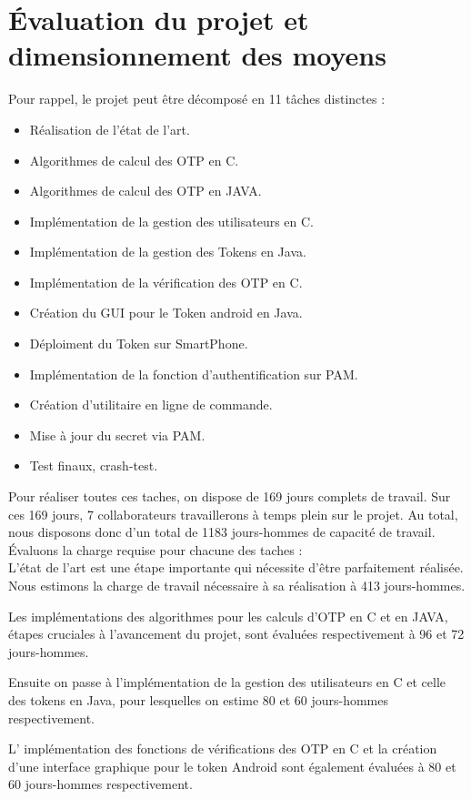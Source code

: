 \documentclass{../../res/univ-projet}
\begin{document}
\section{Évaluation du projet et dimensionnement des moyens}
	Pour rappel, le projet peut être décomposé en 11 tâches distinctes :
	\begin{itemize}
	  \item Réalisation de l'état de l'art.
	  \item Algorithmes de calcul des OTP en C.
	  \item Algorithmes de calcul des OTP en JAVA.
	  \item Implémentation de la gestion des utilisateurs en C.
	  \item Implémentation de la gestion des Tokens en Java.
	  \item Implémentation de la vérification des OTP en C.
	  \item Création du GUI pour le Token android en Java.
	  \item Déploiment du Token sur SmartPhone.
	  \item Implémentation de la fonction d'authentification sur PAM.
	  \item Création d'utilitaire en ligne de commande.
	  \item Mise à jour du secret via PAM.
	  \item Test finaux, crash-test.\\
	\end{itemize}

	Pour réaliser toutes ces taches, on dispose de 169 jours complets de travail. Sur ces 169 jours, 7 collaborateurs travaillerons à temps plein sur le projet. Au total, nous disposons donc d'un total de 1183 jours-hommes de capacité de travail. Évaluons la charge requise pour chacune des taches :\\
	
	L'état de l'art est une étape importante qui nécessite d'être parfaitement réalisée. Nous estimons la charge de travail nécessaire à sa réalisation à 413 jours-hommes.
	
	Les implémentations des algorithmes pour les calculs d'OTP en C et en JAVA, étapes cruciales à l'avancement du projet, sont évaluées respectivement à 96 et 72 jours-hommes.
	
	Ensuite on passe à l'implémentation de la gestion des utilisateurs en C et celle des tokens en Java, pour lesquelles on estime 80 et 60 jours-hommes respectivement.
	
	L' implémentation des fonctions de vérifications des OTP en C et la création d'une interface graphique pour le token Android sont également évaluées à 80 et 60 jours-hommes respectivement. 
	
\end{document}

